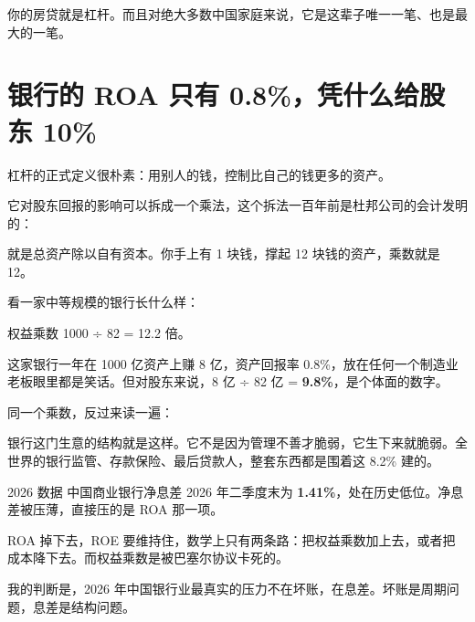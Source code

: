 \begin{pullquote}{}
你的房贷就是杠杆。而且对绝大多数中国家庭来说，它是这辈子唯一一笔、也是最大的一笔。
\end{pullquote}

\section{银行的 ROA 只有 0.8\%，凭什么给股东 10\%}

杠杆的正式定义很朴素：用别人的钱，控制比自己的钱更多的资产。

它对股东回报的影响可以拆成一个乘法，这个拆法一百年前是杜邦公司的会计发明的：

\begin{chainflow}
\chainarrow {}\chainarrow {}
\end{chainflow}

就是总资产除以自有资本。你手上有 1 块钱，撑起 12 块钱的资产，乘数就是 12。

看一家中等规模的银行长什么样：

\begin{bsheet}
\end{bsheet}

权益乘数 1000 ÷ 82 = 12.2 倍。

这家银行一年在 1000 亿资产上赚 8 亿，资产回报率 0.8\%，放在任何一个制造业老板眼里都是笑话。但对股东来说，8 亿 ÷ 82 亿 = \textbf{9.8\%}，是个体面的数字。

同一个乘数，反过来读一遍：

银行这门生意的结构就是这样。它不是因为管理不善才脆弱，它生下来就脆弱。全世界的银行监管、存款保险、最后贷款人，整套东西都是围着这 8.2\% 建的。

\begin{databox}{2026 数据}
中国商业银行净息差 2026 年二季度末为 \textbf{1.41\%}，处在历史低位。净息差被压薄，直接压的是 ROA 那一项。

ROA 掉下去，ROE 要维持住，数学上只有两条路：把权益乘数加上去，或者把成本降下去。而权益乘数是被巴塞尔协议卡死的。

我的判断是，2026 年中国银行业最真实的压力不在坏账，在息差。坏账是周期问题，息差是结构问题。

\end{databox}

